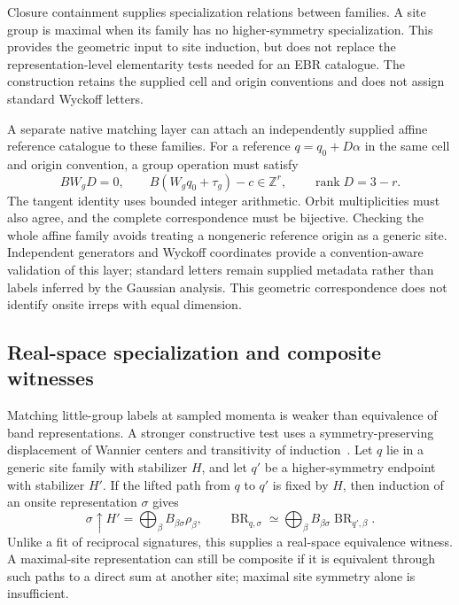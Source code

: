 Closure containment supplies specialization relations between families.
A site group is maximal when its family has no higher-symmetry
specialization. This provides the geometric input to site induction,
but does not replace the representation-level elementarity tests needed
for an EBR catalogue. The construction retains the supplied cell and
origin conventions and does not assign standard Wyckoff letters.

A separate native matching layer can attach an independently supplied
affine reference catalogue to these families. For a reference
$q=q_0+D\alpha$ in the same cell and origin convention, a group
operation must satisfy
\begin{equation}
 BW_gD=0,\qquad B(W_gq_0+\tau_g)-c\in\mathbb Z^r,
 \qquad \operatorname{rank}D=3-r.
 \label{eq:affine-reference-match}
\end{equation}
The tangent identity uses bounded integer arithmetic. Orbit
multiplicities must also agree, and the complete correspondence must
be bijective. Checking the whole affine family avoids treating a
nongeneric reference origin as a generic site. Independent generators
and Wyckoff coordinates provide a convention-aware validation of this
layer; standard letters remain supplied metadata rather than labels
inferred by the Gaussian analysis. This geometric correspondence does
not identify onsite irreps with equal dimension.

\subsection{Real-space specialization and composite witnesses}
Matching little-group labels at sampled momenta is weaker than
equivalence of band representations. A stronger constructive test
uses a symmetry-preserving displacement of Wannier centers and
transitivity of induction~\cite{Cano2018}. Let $q$ lie in a generic
site family with stabilizer $H$, and let $q'$ be a higher-symmetry
endpoint with stabilizer $H'$. If the lifted path from $q$ to $q'$
is fixed by $H$, then induction of an onsite representation $\sigma$
gives
\begin{equation}
 \sigma\uparrow H'=\bigoplus_\beta B_{\beta\sigma}\rho_\beta,
 \qquad
 \operatorname{BR}_{q,\sigma}\simeq
 \bigoplus_\beta B_{\beta\sigma}\operatorname{BR}_{q',\beta}.
 \label{eq:site-specialization-induction}
\end{equation}
Unlike a fit of reciprocal signatures, this supplies a real-space
equivalence witness. A maximal-site representation can still be
composite if it is equivalent through such paths to a direct sum at
another site; maximal site symmetry alone is insufficient.

